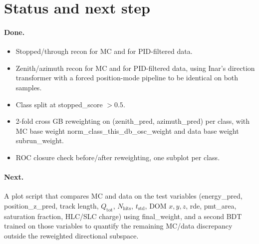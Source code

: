 \documentclass[11pt]{article}
\begin{document}
\section{Status and next step}

\paragraph{Done.}
\begin{itemize}
    \item Stopped/through recon for MC and for PID\nobreakdash-filtered data.
    \item Zenith/azimuth recon for MC and for PID\nobreakdash-filtered data,
          using Inar's direction transformer with a forced
          position\nobreakdash-mode pipeline to be identical on both samples.
    \item Class split at stopped\_score $>0.5$.
    \item 2\nobreakdash-fold cross GB reweighting on
          (zenith\_pred, azimuth\_pred) per class,
          with MC base weight norm\_class\_this\_db\_osc\_weight
          and data base weight subrun\_weight.
    \item ROC closure check before/after reweighting, one subplot per
          class.
\end{itemize}

\paragraph{Next.}
A plot script that compares MC and data on the test variables
(energy\_pred, position\_z\_pred, track length, $Q_\text{tot}$,
$N_\text{hits}$, $t_\text{std}$, DOM $x,y,z$, rde, pmt\_area,
saturation fraction, HLC/SLC charge) using final\_weight, and a
second BDT trained on those variables to quantify the remaining
MC/data discrepancy outside the reweighted directional subspace.
\end{document}
